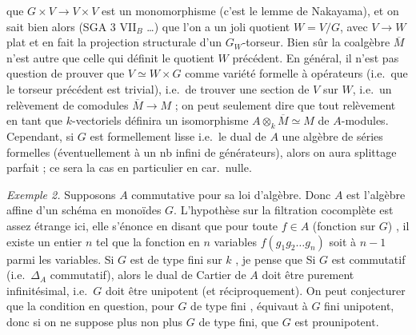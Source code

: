 \documentclass[11pt,a4paper]{article}
\begin{document}


que $G \times V \to V \times V$ est un monomorphisme (c'est le lemme de
Nakayama), et on sait bien alors (SGA 3 VII$_{B}$ …) que \struck{\ill{}}
l'on a un joli quotient $W = V/G$, avec \struck{\ill{}} $V \to W$ plat et en
fait la projection structurale d'un $G_{W}$-torseur. Bien sûr la coalgèbre
$\overline{M}$ n'est autre que celle qui définit le quotient $W$ précédent. En
général, il n'est pas question de prouver que $V \simeq W \times G$ comme
variété formelle à opérateurs (i.e.\ que le torseur précédent est trivial),
i.e.\ de trouver une \struck{\ill{}} section de $V$ sur $W$, i.e.\ un relèvement
de comodules $\overline{M} \to M$ ; on peut seulement dire que tout relèvement
en tant que $k$-vectoriels définira un isomorphisme
$A \otimes_{k} \overline{M} \simeq M$ de $A$-modules. Cependant, si $G$ est
formellement lisse i.e.\ le dual de $A$ une algèbre de séries formelles
(éventuellement à un nb infini de générateurs), alors on aura splittage parfait ;
ce sera la cas en particulier en car.\ nulle.

\emph{Exemple 2.} Supposons $A$ commutative pour sa loi d'algèbre. Donc $A$ est
l'algèbre affine d'un schéma en monoïdes  $G$. L'hypothèse sur la
filtration cocomplète est assez étrange ici, elle s'énonce en disant que pour
toute $f \in A$ (fonction sur $G$) \struck{\ill{}}, il existe un entier $n$
 tel que la fonction en $n$ variables $f(g_{1}g_{2}\dots g_{n})$
soit   à $n-1$ parmi les
variables. Si $G$ est de type fini sur $k$ , je pense que
 \struck{\ill{}} Si $G$ est commutatif
(i.e.\ $\Delta_{A}$ commutatif), alors le dual de Cartier de $A$ doit être
purement infinitésimal, i.e.\ $G$ doit être unipotent (et réciproquement). On
peut conjecturer que \struck{\ill{}} la condition en question, pour $G$ de type
fini , équivaut à $G$ fini unipotent, donc si on ne
suppose plus non plus $G$ de type fini, que $G$ est 
prounipotent.

\end{document}
